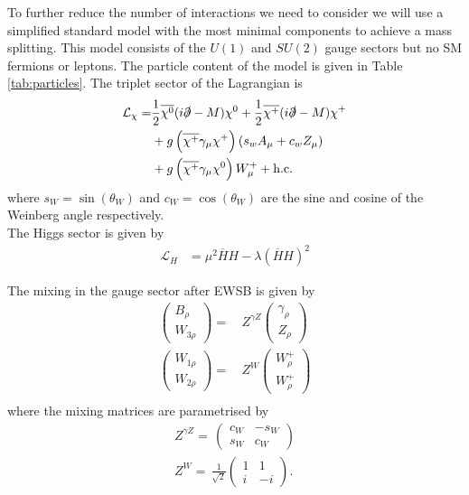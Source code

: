 \documentclass[11pt]{article}
\newcommand{\mychi}{\raisebox{0pt}[1ex][1ex]{$\chi$}}
\begin{document}
To further reduce the number of interactions we need to consider we will use a simplified standard model with the most minimal components to achieve a mass splitting.  This model consists of the $U(1)$ and $SU(2)$ gauge sectors but no SM fermions or leptons.  The particle content of the model is given in Table \ref{tab:particles}.  The triplet sector of the Lagrangian is
\begin{align}
\begin{split}
\mathcal{L}_{\chi}=&\frac{1}{2}\overline{\mychi^0}(i\slashed{\partial}-M)\mychi^0+\frac{1}{2}\overline{\mychi^+}(i\slashed{\partial}-M)\mychi^{+}\\
&+g\left(\overline{\mychi^+}\gamma_{\mu}\mychi^+\right)\left(s_wA_{\mu}+c_wZ_{\mu}\right)\\
&+g\left(\overline{\mychi^+}\gamma_{\mu}\mychi^0 \right)W_{\mu}^++\text{h.c.}
\end{split}
\end{align}
where $s_W=\sin(\theta_W)$ and $c_W=\cos(\theta_W)$ are the sine and cosine of the Weinberg angle respectively.\\

The Higgs sector is given by
\begin{align}
\mathcal{L}_{H}&=\mu^2 \overline{H}H-\lambda(\overline{H}H)^2
\end{align}

The mixing in the gauge sector after EWSB is given by
\begin{align} 
\left(\begin{array}{c} 
B_{{\rho}}\\ 
W_{{3 \rho}}\end{array} \right) 
 = & \,Z^{\gamma Z}
\left(\begin{array}{c} 
\gamma_{{\rho}}\\ 
Z_{{\rho}}\end{array} \right) \\ 
\left(\begin{array}{c} 
W_{{1 \rho}}\\ 
W_{{2 \rho}}\end{array} \right) 
 = & \,Z^{W}
\left(\begin{array}{c} 
W^+_{{\rho}}\\ 
W^+_{{\rho}}\end{array} \right) \\ 
\end{align} 
where the mixing matrices are parametrised by \\ 
\begin{align} 
Z^{\gamma Z}= \, \left( 
\begin{array}{cc} 
c_W  & - s_W   \\ 
 s_W  & c_W \end{array} 
\right) \\ 
Z^{W}= \,\frac{1}{\sqrt{2}}  \left( 
\begin{array}{cc} 
1& 1 \\ 
 i   & -i  \end{array} 
\right). \\ 
\end{align} 
\end{document}
